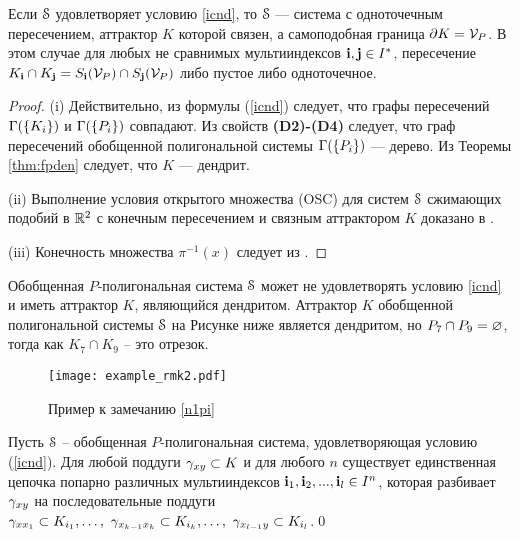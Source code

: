 \begin{remark}\label{fpro} 
Если ${\EuScript S}$ удовлетворяет условию \eqref{icnd}, то ${\EuScript S}$ --- система с одноточечным пересечением, аттрактор $K$ которой связен, а самоподобная граница $\partial K={\mathcal V}_P$. 
В этом случае для любых не сравнимых мультииндексов ${\bf{i}},{\bf{j}}\in I^*$, пересечение $K_{\bf{i}}\cap K_{\bf{j}}=S_{\bf{i}}({\mathcal V}_P)\cap S_{\bf{j}}({\mathcal V}_P)$ либо пустое либо одноточечное.
\end{remark}

\begin{proof}
(i) Действительно, из формулы (\ref{icnd}) следует, что графы пересечений $\Gamma(\{K_i\})$ и $\Gamma(\{P_i\})$ совпадают. 
Из свойств {\bf (D2)-(D4)} следует, что граф пересечений обобщенной полигональной системы  $\Gamma(\{P_i\})$ --- дерево. 
Из Теоремы \ref{thm:fpden} следует, что $K$ --- дендрит.

(ii) Выполнение условия открытого множества (OSC) для систем ${\EuScript S}$ сжимающих подобий в $\mathbb{R}^2$ с конечным пересечением и связным аттрактором $K$ доказано в \cite{BR}.

(iii) Конечность множества $\pi^{-1}(x)$ следует из \cite[Proposition 2.3]{FIP}.
\end{proof}




\begin{remark}\label{n1pi}  
Обобщенная $P$-полигональная система ${\EuScript S}$ может не удовлетворять условию \ref{icnd} и иметь аттрактор $K$, являющийся дендритом. 
Аттрактор $K$ обобщенной полигональной системы ${\EuScript S}$ на Рисунке ниже является дендритом, но  $P_7\cap P_9=\varnothing$, тогда как $K_7\cap K_9$ -- это отрезок.
\end{remark}

\begin{figure}[H]
    \centering
    \texttt{[image: example\_rmk2.pdf]}
    \caption{Пример к замечанию \ref{n1pi}}
\label{img:rmk1}
\end{figure}

\begin{corollary}
Пусть ${\EuScript S}$ -- обобщенная $P$-полигональная система, удовлетворяющая условию (\ref{icnd}). Для любой поддуги $\gamma_{xy}\subset K$ и для любого $n$ существует единственная цепочка попарно различных мультииндексов ${\bf{i}}_1,{\bf{i}}_2,...,{\bf{i}}_l\in I^n$, которая разбивает $\gamma_{xy}$ на последовательные поддуги $\gamma_{xx_1}\subset K_{i_1},\ldots,\ \gamma_{x_{k-1}x_k}\subset K_{i_k},\ldots,\ \gamma_{x_{l-1}y}\subset K_{i_l}$.\qed
\end{corollary}


